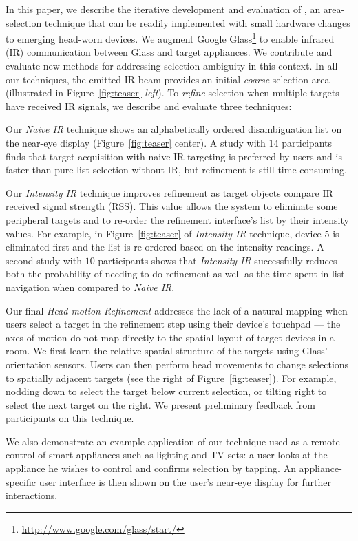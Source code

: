 In this paper, we describe the iterative development and evaluation of \systemnamenospace, an area-selection technique that can be readily implemented with small hardware changes to emerging head-worn devices. We augment Google Glass\footnote{\url{http://www.google.com/glass/start/}} to enable infrared (IR) communication between Glass and target appliances. We contribute and evaluate new methods for addressing selection ambiguity in this context. In all our techniques, the emitted IR beam %
 provides an initial {\em coarse} selection area (illustrated in Figure~\ref{fig:teaser} {\em left}). To {\em refine} selection when multiple targets have received IR signals, we describe and evaluate three techniques:

 Our {\em Naive IR} technique shows an alphabetically ordered disambiguation list on the near-eye display (Figure~\ref{fig:teaser} center). A study with $14$ participants finds that target acquisition with naive IR targeting is preferred by users and is faster than pure list selection without IR, but refinement is still time consuming.

Our {\em Intensity IR} technique improves refinement as target objects compare IR received signal strength (RSS). This value allows the system to eliminate some peripheral targets and to re-order the refinement interface's list by their intensity values. For example, in Figure~\ref{fig:teaser} of {\em Intensity IR} technique, device 5 is eliminated first and the list is re-ordered based on the intensity readings. A second study with $10$ participants shows that {\em Intensity IR} successfully reduces both the probability of needing to do refinement as well as the time spent in list navigation when compared to {\em Naive IR}.

Our final {\em Head-motion Refinement} addresses the lack of a natural mapping when users select a target in the refinement step using their device's touchpad --- the axes of motion do not map directly to the spatial layout of target devices in a room. We first learn the relative spatial structure of the targets using Glass' orientation sensors. Users can then perform head movements to change selections to spatially adjacent targets (see the right of Figure~\ref{fig:teaser}). For example, nodding down to select the target below current selection, or tilting right to select the next target on the right. We present preliminary feedback from participants on this technique.

We also demonstrate an example application of our technique used as a remote control of smart appliances such as lighting and TV sets: a user looks at the appliance he wishes to control and confirms selection by tapping. An appliance-specific user interface is then shown on the user's near-eye display for further interactions. 

